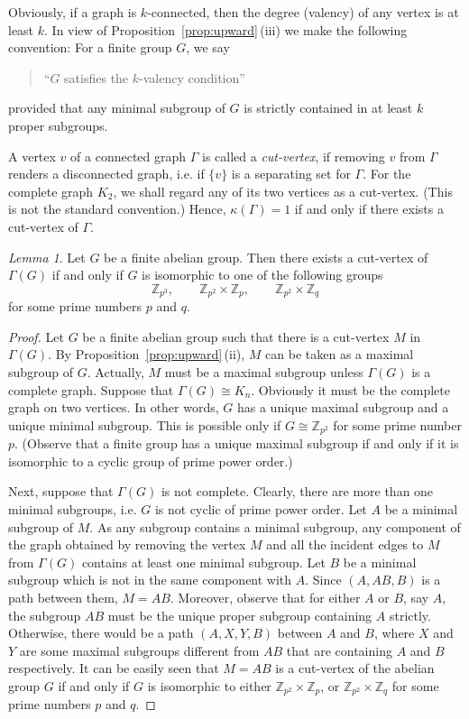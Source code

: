 \documentclass[a4paper,12pt]{article}
\theoremstyle{definition}
\theoremstyle{remark}
\theoremstyle{theorem}
\newtheorem{lem}[theorem]{Lemma}
\begin{document}
Obviously, if a graph is $k$-connected, then the degree (valency) of any vertex is at least $k$. In view of Proposition~\ref{prop:upward}\,(iii) we make the following convention: For a finite group $G$, we say \begin{quote}
  ``$G$ satisfies the $k$-valency condition''
\end{quote} provided that any minimal subgroup of $G$ is strictly contained in at least $k$ proper subgroups.

A vertex $v$ of a connected graph $\Gamma$ is called a \emph{cut-vertex}, if removing $v$ from $\Gamma$ renders a disconnected graph, i.e. if $\{v\}$ is a separating set for $\Gamma$. For the complete graph $K_2$, we shall regard any of its two vertices as a cut-vertex. (This is not the standard convention.) Hence, $\kappa(\Gamma)=1$ if and only if there exists a cut-vertex of $\Gamma$. 

\begin{lem}\label{lem:abelian}
  Let $G$ be a finite abelian group. Then there exists a cut-vertex
  of $\Gamma(G)$ if and only if $G$ is isomorphic to one of the
  following groups  $$\mathbb{Z}_{p^3},\qquad\mathbb{Z}_{p^2}\times\mathbb{Z}_p,\qquad\mathbb{Z}_{p^2}\times\mathbb{Z}_q$$
  for some prime numbers $p$ and $q$.
\end{lem}

\begin{proof}
  Let $G$ be a finite abelian group such that there is a cut-vertex
  $M$ in $\Gamma(G)$. By Proposition~\ref{prop:upward}\,(ii), $M$ can
  be taken as a maximal subgroup of $G$. Actually, $M$ must be a
  maximal subgroup unless $\Gamma(G)$ is a complete graph. Suppose
  that $\Gamma(G)\cong K_n$. Obviously it must be the complete graph
  on two vertices. In other words, $G$ has a unique maximal subgroup
  and a unique minimal subgroup. This is possible only if
  $G\cong\mathbb{Z}_{p^2}$ for some prime number $p$. (Observe that a
  finite group has a unique maximal subgroup if and only if it is
  isomorphic to a cyclic group of prime power order.)

  Next, suppose that $\Gamma(G)$ is not complete. Clearly, there are
  more than one minimal subgroups, i.e. $G$ is not cyclic of prime power order. Let $A$ be a minimal subgroup of $M$. As any subgroup contains
  a minimal subgroup, any component of the graph obtained by removing the vertex $M$ and all the incident edges to $M$ from $\Gamma(G)$ contains at least one minimal subgroup. Let $B$ be a minimal subgroup which is not in the same
  component with $A$. Since $(A,AB,B)$ is a path between them,
  $M=AB$. Moreover, observe that for either $A$ or $B$, say $A$, the subgroup $AB$ must be the unique proper subgroup containing $A$ strictly. Otherwise, there would be a path $(A,X,Y,B)$ between $A$ and $B$, where $X$ and $Y$ are some maximal subgroups different from $AB$ that are containing $A$ and $B$ respectively. It can be easily seen that $M=AB$ is a cut-vertex of the abelian group $G$ if and only if $G$ is isomorphic to either
  $\mathbb{Z}_{p^2}\times\mathbb{Z}_p$, or
  $\mathbb{Z}_{p^2}\times\mathbb{Z}_q$ for some prime numbers $p$ and
  $q$. 
\end{proof}
\end{document}
